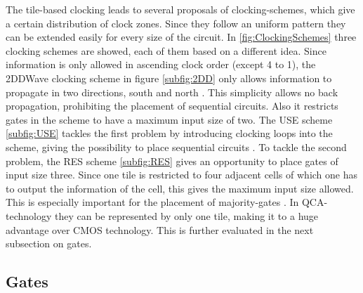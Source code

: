 The tile-based clocking leads to several proposals of clocking-schemes, which give a certain distribution of clock zones. Since they follow an uniform pattern they can be extended easily for every size of the circuit. In \ref{fig:ClockingSchemes} three clocking schemes are showed, each of them based on a different idea. Since information is only allowed in ascending clock order (except 4 to 1), the 2DDWave clocking scheme in figure \ref{subfig:2DD} only allows information to propagate in two directions, south and north \cite{2DD}. This simplicity allows no back propagation, prohibiting the placement of sequential circuits. Also it restricts gates in the scheme to have a maximum input size of two. The USE scheme \ref{subfig:USE} tackles the first problem by introducing clocking loops into the scheme, giving the possibility to place sequential circuits \cite{USE}. To tackle the second problem, the RES scheme \ref{subfig:RES} gives an opportunity to place gates of input size three. Since one tile is restricted to four adjacent cells of which one has to output the information of the cell, this gives the maximum input size allowed. This is especially important for the placement of majority-gates \cite{RES}. In QCA-technology they can be represented by only one tile, making it to a huge advantage over CMOS technology. This is further evaluated in the next subsection on gates.

\subsection{Gates}\label{sub:gates}

